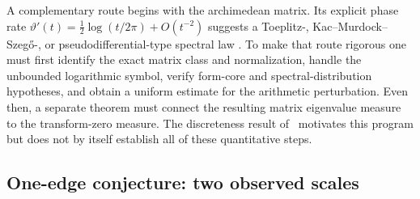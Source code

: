 \documentclass[11pt,a4paper]{article}
\begin{document}
A complementary route begins with the archimedean matrix. Its explicit phase
rate $\vartheta'(t)=\tfrac12\log(t/2\pi)+O(t^{-2})$ suggests a
Toeplitz-, Kac--Murdock--Szeg\H{o}-, or pseudodifferential-type spectral law
\cite{KMS1953,Widom1982}. To make that route rigorous one must first identify
the exact matrix class and normalization, handle the unbounded logarithmic
symbol, verify form-core and spectral-distribution hypotheses, and obtain a
uniform estimate for the arithmetic perturbation. Even then, a separate theorem
must connect the resulting matrix eigenvalue measure to the transform-zero
measure. The discreteness result of~\cite[Thm.~3.6]{CCM2025} motivates this
program but does not by itself establish all of these quantitative steps.

\subsection{One-edge conjecture: two observed scales}\label{ssec:oneedge}
\end{document}
